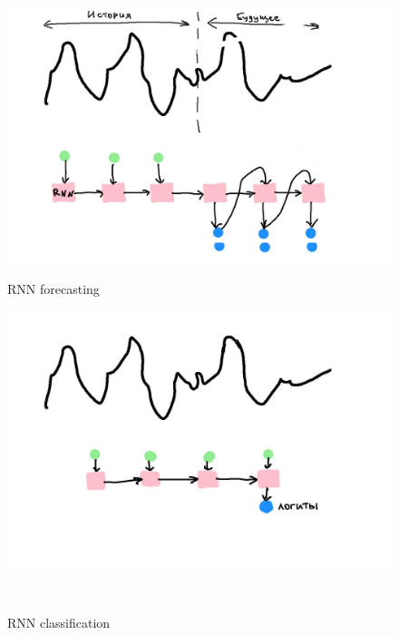 \documentclass[12pt,fleqn]{article}
\begin{document}
\begin{figure}[!htb]
    \centering
    \begin{minipage}{0.45\linewidth}
        \centering
        \includegraphics[width=\linewidth]{illustrations/rnn-forecasting.jpg}
        \caption{RNN forecasting}
        \label{fig:rnn-forecasting}
    \end{minipage}
    \begin{minipage}{0.45\linewidth}
        \centering
        \includegraphics[width=\linewidth]{illustrations/rnn-clf-1.jpg}
        \caption{RNN classification}
        \label{fig:rnn-classification}
    \end{minipage}\\
    \begin{minipage}{0.45\linewidth}
        \centering

\end{minipage}
\end{figure}
\end{document}
